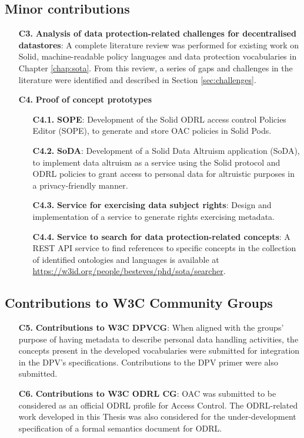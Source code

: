 \subsection{Minor contributions}
\label{sec:contr_minor}

\begin{enumerate}
    \item [\textbf{C3.}] \textbf{Analysis of data protection-related challenges for decentralised datastores}: A complete literature review was performed for existing work on Solid, machine-readable policy languages and data protection vocabularies in Chapter \ref{chap:sota}. From this review, a series of gaps and challenges in the literature were identified and described in Section \ref{sec:challenges}.
    \item [\textbf{C4.}] \textbf{Proof of concept prototypes}
    \begin{enumerate}
        \item [\textbf{C4.1.}] \textbf{SOPE}: Development of the Solid ODRL access control Policies Editor (SOPE), to generate and store OAC policies in Solid Pods.
        \item [\textbf{C4.2.}] \textbf{SoDA}: Development of a Solid Data Altruism application (SoDA), to implement data altruism as a service using the Solid protocol and ODRL policies to grant access to personal data for altruistic purposes in a privacy-friendly manner.
        \item [\textbf{C4.3.}] \textbf{Service for exercising data subject rights}: Design and implementation of a service to generate rights exercising metadata.
        \item [\textbf{C4.4.}] \textbf{Service to search for data protection-related concepts}: A REST API service to find references to specific concepts in the collection of identified ontologies and languages is available at \url{https://w3id.org/people/besteves/phd/sota/searcher}.
    \end{enumerate}
\end{enumerate}

\subsection{Contributions to W3C Community Groups}
\label{sec:contr_w3c}

\begin{enumerate}
    \item [\textbf{C5.}] \textbf{Contributions to W3C DPVCG}: When aligned with the groups' purpose of having metadata to describe personal data handling activities, the concepts present in the developed vocabularies were submitted for integration in the DPV's specifications. Contributions to the DPV primer were also submitted.
    \item [\textbf{C6.}] \textbf{Contributions to W3C ODRL CG}: OAC was submitted to be considered as an official ODRL profile for Access Control. The ODRL-related work developed in this Thesis was also considered for the under-development specification of a formal semantics document for ODRL.
\end{enumerate}